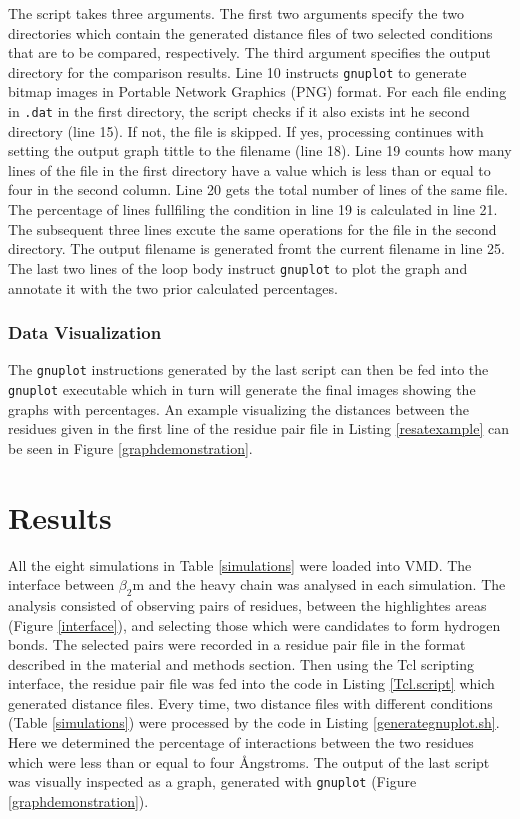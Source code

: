 \documentclass[11pt,twocolumn]{article}
\newcommand{\4}{four {\AA}ngstroms}
\begin{document}
The script takes three arguments. The first two arguments specify the two directories which contain the generated distance files of two selected conditions that are to be compared, respectively. The third argument specifies the output directory for the comparison results. Line 10 instructs \texttt{gnuplot} to generate bitmap images in Portable Network Graphics (PNG) format. For each file ending in \texttt{.dat} in the first directory, the script checks if it also exists int he second directory (line 15). If not, the file is skipped. If yes, processing continues with setting the output graph tittle to the filename (line 18). Line 19 counts how many lines of the file in the first directory have a value which is less than or equal to four in the second column. Line 20 gets the total number of lines of the same file. The percentage of lines fullfiling the condition in line 19 is calculated in line 21. The subsequent three lines excute the same operations for the file in the second directory. The output filename is generated fromt the current filename in line 25. The last two lines of the loop body instruct \texttt{gnuplot} to plot the graph and annotate it with the two prior calculated percentages.  

\subsubsection*{Data Visualization}

The \texttt{gnuplot} instructions generated by the last script can then be fed into the \texttt{gnuplot} executable which in turn will generate the final images showing the graphs with percentages. An example visualizing the distances between the residues given in the first line of the residue pair file in Listing \ref{resatexample} can be seen in Figure \ref{graphdemonstration}.


\section*{Results}

All the eight simulations in Table \ref{simulations} were loaded into VMD. The interface between $\beta_{2}$m and the heavy chain was analysed in each simulation. The analysis consisted of observing pairs of residues, between the highlightes areas (Figure \ref{interface}), and selecting those which were candidates to form hydrogen bonds. 
The selected pairs were recorded in a residue pair file in the format described in the material and methods section. Then using the 
Tcl scripting interface, the residue pair file was fed into the code in Listing \ref{Tcl.script} which generated distance files. Every time, two distance files with different conditions (Table \ref{simulations}) were processed by the code in Listing \ref{generategnuplot.sh}. Here we determined the percentage of interactions between the two residues which were less than or equal to four {\AA}ngstroms. The output of the last script  was visually inspected as a graph, generated with \texttt{gnuplot} (Figure \ref{graphdemonstration}).
\end{document}
